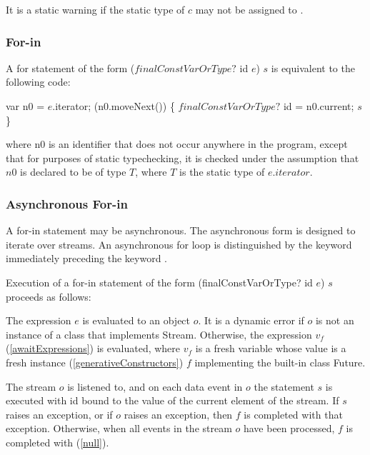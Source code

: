 \documentclass{article}
\newcommand{\code}[1]{{\sf #1}}
\begin{document}
\LMHash{}
It is a static warning if the static type of $c$ may not be assigned to .




\subsubsection{For-in}

\LMHash{}
A for statement of the form \code{ \FOR{} ($finalConstVarOrType?$ id \IN{} $e$) $s$} is equivalent to the following code: 

\begin{dartCode}
var n0 = $e$.iterator;
\WHILE{} (n0.moveNext()) \{
   $finalConstVarOrType?$ id = n0.current;
   $s$ 
\}
\end{dartCode}
where \code{n0} is an identifier that does not occur anywhere in the program, except that for purposes of static typechecking, it is checked under the assumption that $n0$ is declared to be of type $T$, where $T$ is the static type of $e.iterator$.

 
 
\subsubsection{Asynchronous For-in}

\LMHash{}
A for-in statement may be asynchronous. The asynchronous form is designed to iterate over streams. An asynchronous for loop is distinguished by the keyword \AWAIT{} immediately preceding the keyword \FOR.

\LMHash{}
Execution of a for-in statement of the form  \code{\AWAIT{} \FOR{} (finalConstVarOrType? id \IN{} $e$) $s$} proceeds as follows:

\LMHash{}
The expression $e$ is evaluated to an object $o$. It is a dynamic error if $o$ is not an instance of a class that implements \code{Stream}. Otherwise, the expression \code{\AWAIT{} $v_f$}  (\ref{awaitExpressions}) is evaluated, where $v_f$ is a fresh variable whose value is a fresh instance (\ref{generativeConstructors}) $f$ implementing the built-in class \code{Future}.

\LMHash{}
The stream $o$ is listened to,  and on each data event in $o$ the statement $s$ is executed with \code{id} bound to the value of the current element of the stream. If $s$ raises an exception, or if $o$ raises an exception, then $f$ is completed with that exception. Otherwise, when all events in the stream $o$ have been processed, $f$ is completed with \NULL{}  (\ref{null}).
\end{document}
